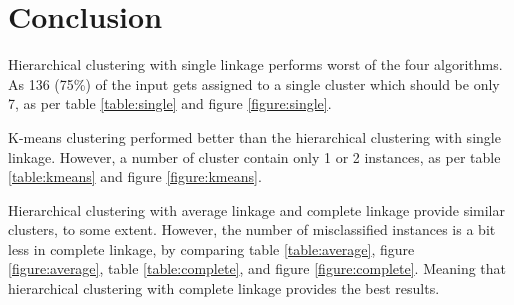 \documentclass[
11pt, %
a4paper, %
oneside, %
headinclude,footinclude, %
BCOR5mm, %
]{scrartcl}
\begin{document}
\newpage
\section{Conclusion}
Hierarchical clustering with single linkage performs worst of the four algorithms. As 136 (75\%) of the input gets assigned to a single cluster which should be only 7, as per table \ref{table:single} and figure \ref{figure:single}.

K-means clustering performed better than the hierarchical clustering with single linkage. However, a number of cluster contain only 1 or 2 instances, as per table \ref{table:kmeans} and figure \ref{figure:kmeans}.

Hierarchical clustering with average linkage and complete linkage provide similar clusters, to some extent. However, the number of misclassified instances is a bit less in complete linkage, by comparing table \ref{table:average}, figure \ref{figure:average}, table \ref{table:complete}, and figure \ref{figure:complete}. Meaning that hierarchical clustering with complete linkage provides the best results.
\end{document}
